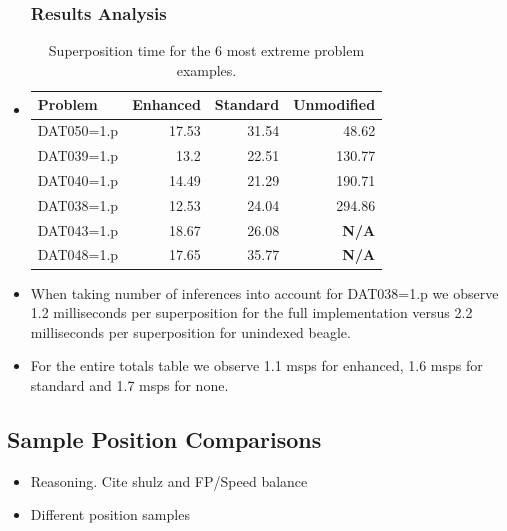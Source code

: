\documentclass[10pt,xcolor={dvipsnames}]{beamer}
\begin{document}
\begin{NoHyper}
\begin{frame}
  \begin{itemize}
  \frametitle{Results Analysis}
  \item<1->[]
 \begin{table}[H]\scriptsize
  \caption{Superposition time for the 6 most extreme problem examples.}
\begin{tabular}{| l || r | r | r |}  \hline
Problem&Enhanced&Standard&Unmodified\\  \hline
DAT050=1.p&17.53& 31.54& 48.62\\
DAT039=1.p&13.2& 22.51& 130.77\\
DAT040=1.p&14.49& 21.29& 190.71\\
DAT038=1.p&12.53& 24.04& 294.86\\
DAT043=1.p&18.67& 26.08& \textbf{N/A} \\
DAT048=1.p&17.65& 35.77& \textbf{N/A}\\\hline
\end{tabular}\end{table}
  \item<2-> When taking number of inferences into account for DAT038=1.p we observe
  1.2 milliseconds per superposition for the full implementation versus 2.2 milliseconds
  per superposition for unindexed beagle.
  \item<3-> For the entire totals table we observe 1.1 msps for enhanced, 1.6 msps
  for standard and 1.7 msps for none.
  \end{itemize}
\end{frame}

\subsection{Sample Position Comparisons}
\begin{frame}
  \begin{itemize}
  \frametitle{Fingerprint Sampling Varieties}
  \item<1-> Reasoning. Cite shulz and FP/Speed balance
  \item<2-> Different position samples
  \end{itemize}
\end{frame}


\end{NoHyper}
\end{document}
